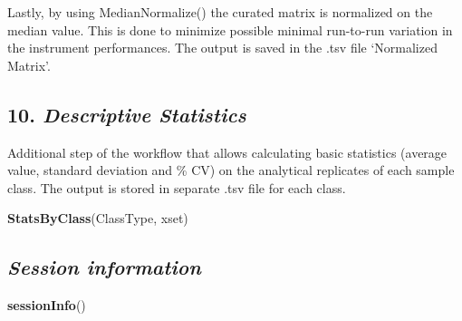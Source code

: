 \documentclass[
]{article}
\newenvironment{Shaded}{\begin{snugshade}}{\end{snugshade}}
\newcommand{\KeywordTok}[1]{\textcolor[rgb]{0.13,0.29,0.53}{\textbf{#1}}}
\newcommand{\NormalTok}[1]{#1}
\begin{document}
Lastly, by using MedianNormalize() the curated matrix is normalized on
the median value. This is done to minimize possible minimal run-to-run
variation in the instrument performances. The output is saved in the
.tsv file `Normalized Matrix'.

\hypertarget{descriptive-statistics}{%
\subsection{\texorpdfstring{10. \emph{Descriptive
Statistics}}{10. Descriptive Statistics}}\label{descriptive-statistics}}

Additional step of the workflow that allows calculating basic statistics
(average value, standard deviation and \% CV) on the analytical
replicates of each sample class. The output is stored in separate .tsv
file for each class.

\begin{Shaded}
\begin{Highlighting}[]
\KeywordTok{StatsByClass}\NormalTok{(ClassType, xset)}
\end{Highlighting}
\end{Shaded}

\hypertarget{session-information}{%
\subsection{\texorpdfstring{\emph{Session
information}}{Session information}}\label{session-information}}

\begin{Shaded}
\begin{Highlighting}[]
\KeywordTok{sessionInfo}\NormalTok{()}
\end{Highlighting}
\end{Shaded}
\end{document}
